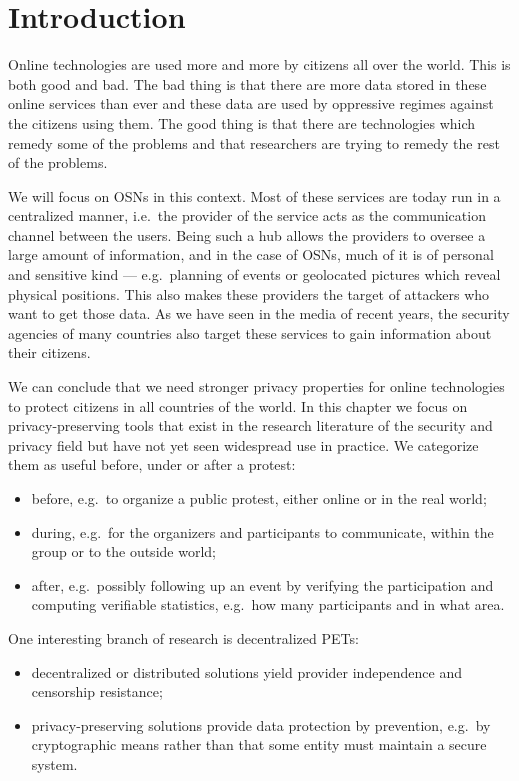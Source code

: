 \section{Introduction}
\label{Introduction}

Online technologies are used more and more by citizens all over the world.
This is both good and bad.
The bad thing is that there are more data stored in these online services than 
ever and these data are used by oppressive regimes against the citizens using 
them.
The good thing is that there are technologies which remedy some of the problems 
and that researchers are trying to remedy the rest of the problems.

We will focus on \acp{OSN} in this context.
Most of these services are today run in a centralized manner, i.e.\ the 
provider of the service acts as the communication channel between the users.
Being such a hub allows the providers to oversee a large amount of information, 
and in the case of \acp{OSN}, much of it is of personal and sensitive kind ---  
e.g.\ planning of events or geolocated pictures which reveal physical 
positions.
This also makes these providers the target of attackers who want to get those 
data.
As we have seen in the media of recent years, the security agencies of many 
countries also target these services to gain information about their citizens.

We can conclude that we need stronger privacy properties for online 
technologies to protect citizens in all countries of the world.
In this chapter we focus on privacy-preserving tools that exist in the research 
literature of the security and privacy field but have not yet seen widespread 
use in practice.
We categorize them as useful before, under or after a protest:
\begin{itemize}
  \item before, e.g.\ to organize a public protest, either online or in the 
    real world;
  \item during, e.g.\ for the organizers and participants to communicate, 
    within the group or to the outside world;
  \item after, e.g.\ possibly following up an event by verifying the 
    participation and computing verifiable statistics, e.g.\ how many 
    participants and in what area.
\end{itemize}

One interesting branch of research is decentralized \acp{PET}:
\begin{itemize}
  \item decentralized or distributed solutions yield provider independence and 
    censorship resistance;
  \item privacy-preserving solutions provide data protection by prevention, 
    e.g.\ by cryptographic means rather than that some entity must maintain 
    a secure system.
\end{itemize}

